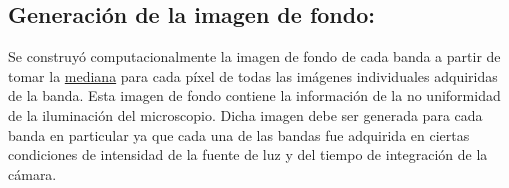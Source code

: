\subsection{Generación de la imagen de fondo: \href{https://github.com/jrr1984/defects_analysis/blob/master/MAIN/bg.py}{\faGithub}}
\label{sec:genimf}

\hspace{0.5cm}Se construyó computacionalmente la imagen de fondo de cada banda a partir de tomar la \underline{mediana} para cada píxel de todas las imágenes individuales adquiridas de la banda. Esta imagen de fondo contiene la información de la no uniformidad de la iluminación del microscopio. Dicha imagen debe ser generada para cada banda en particular ya que cada una de las bandas fue adquirida en ciertas condiciones de intensidad de la fuente de luz y del tiempo de integración de la cámara. 

